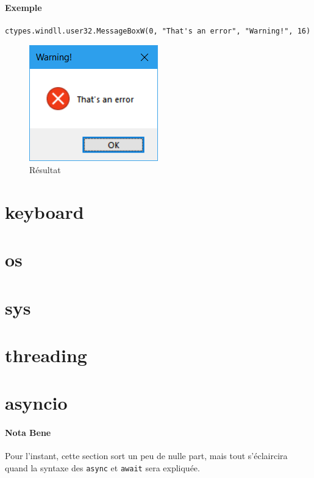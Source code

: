 \documentclass[a4paper, 10pt]{article}
\begin{document}
\paragraph{Exemple}
\begin{verbatim}
ctypes.windll.user32.MessageBoxW(0, "That's an error", "Warning!", 16)
\end{verbatim}
\begin{figure}[h]
\begin{center}
\includegraphics[scale=0.5]{errorwindow.png}
\caption*{Résultat}
\end{center}
\end{figure}

\section{keyboard}

\section{os}

\section{sys}

\section{threading}

\section{asyncio}

\paragraph{Nota Bene} Pour l'instant, cette section sort un peu de nulle part, mais tout s'éclaircira quand la syntaxe des \texttt{async} et \texttt{await} sera expliquée.\bigskip
\end{document}
